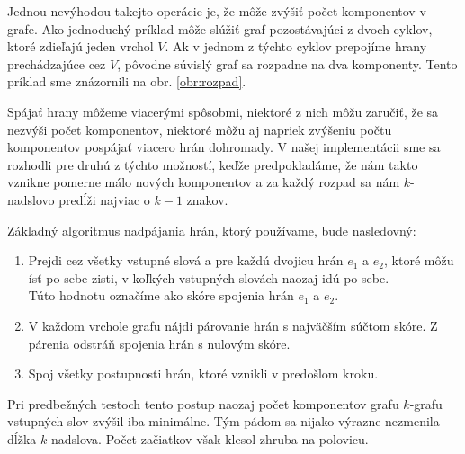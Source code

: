 Jednou nevýhodou takejto operácie je, že môže zvýšiť počet komponentov v grafe.
Ako jednoduchý príklad môže slúžiť graf pozostávajúci z dvoch cyklov, ktoré
zdieľajú jeden vrchol $V$. Ak v jednom z týchto cyklov prepojíme hrany
prechádzajúce cez $V$, pôvodne súvislý graf sa rozpadne na dva komponenty.
Tento príklad sme znázornili na obr. \ref{obr:rozpad}.

Spájať hrany môžeme viacerými spôsobmi, niektoré z nich môžu zaručiť, že sa
nezvýši počet komponentov, niektoré môžu aj napriek zvýšeniu počtu komponentov
pospájať viacero hrán dohromady. V našej implementácii sme sa rozhodli pre druhú
z týchto možností, keďže predpokladáme, že nám takto vznikne pomerne málo nových
komponentov a za každý rozpad sa nám $k$-nadslovo predĺži najviac o $k-1$ znakov.

Základný algoritmus nadpájania hrán, ktorý používame, bude nasledovný:
\begin{enumerate}
    \item Prejdi cez všetky vstupné slová a pre každú dvojicu hrán $e_1$ a $e_2$, ktoré
          môžu ísť po sebe zisti, v koľkých vstupných slovách naozaj idú po sebe.\\
          Túto hodnotu označíme ako skóre spojenia hrán $e_1$ a $e_2$.
    \item V každom vrchole grafu nájdi párovanie hrán s najväčším súčtom skóre. Z
          párenia odstráň spojenia hrán s nulovým skóre.
    \item Spoj všetky postupnosti hrán, ktoré vznikli v predošlom kroku.
\end{enumerate}

Pri predbežných testoch tento postup naozaj počet
komponentov grafu $k$-grafu vstupných slov zvýšil iba minimálne. Tým pádom
sa nijako výrazne nezmenila dĺžka $k$-nadslova.
Počet začiatkov však klesol zhruba na polovicu.
